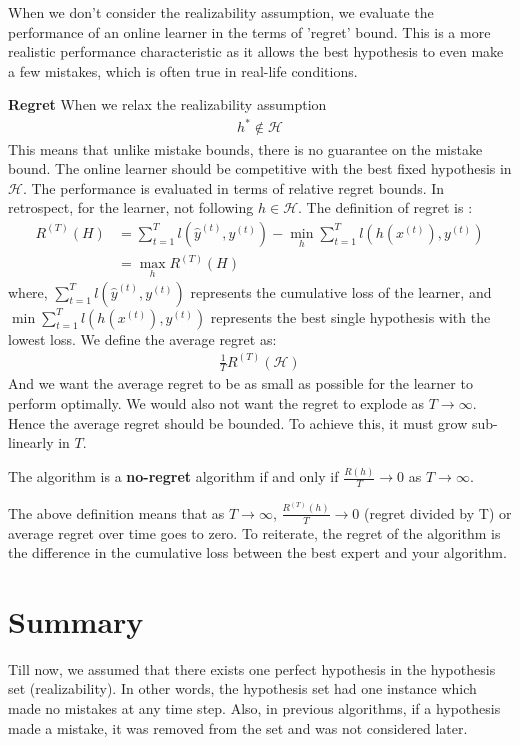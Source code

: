 \documentclass[11pt]{article}
\DeclareMathOperator*{\minimize}{min}
\DeclareMathOperator*{\maximize}{max}
\begin{document}
When we don't consider the realizability assumption, we evaluate the performance of an online learner in the terms of 'regret' bound. This is a more realistic performance characteristic as it allows the best hypothesis to even make a few mistakes, which is often true in real-life conditions.

\normalfont\textbf{Regret} 
When we relax the realizability assumption
\begin{align*}
    h^{*} \notin \mathcal{H}
\end{align*}
This means that unlike mistake bounds, there is no guarantee on the mistake bound. The online learner should be competitive with the best fixed hypothesis in $\mathcal{H}$. The performance is evaluated in terms of relative regret bounds. In retrospect, for the learner, not following $ h \in \mathcal{H}$. The definition of regret is : 
\begin{align}
    R^{(T)}(H)&=\sum_{t=1}^{T} l(\hat{y}^{(t)}, y^{(t)}) - \minimize_{h}  \sum_{t=1}^{T} l(h(x^{(t)}), y^{(t)})\label{def:regret}
    \\
    &= \maximize_{h} R^{(T)}(H)
\end{align} 
\normalfont
where, $\sum_{t=1}^{T} l(\hat{y}^{(t)}, y^{(t)})$ represents the cumulative loss of the learner, and $\minimize\sum_{t=1}^{T} l(h(x^{(t)}), y^{(t)})$ represents the best single hypothesis with the lowest loss. We define the average regret as:
\begin{align}
    \frac{1}{T}R^{(T)}(\mathcal{H})
\end{align}
And we want the average regret to be as small as possible for the learner to perform optimally. We would also not want the regret to explode as $T \rightarrow \infty$. Hence the average regret should be bounded. To achieve this, it must grow sub-linearly in $T$.


The algorithm is a \textbf{no-regret} algorithm if and only if $\frac{R(h)}{T}\rightarrow0$ as $T\rightarrow\infty$.

\normalfont
The above definition means that as $T\rightarrow\infty$, $\frac{R^{(T)}(h)}{T}\rightarrow0$ (regret divided by T) or average regret over time goes to zero. 
To reiterate, the regret of the algorithm is the difference in the cumulative loss between the best expert and your algorithm.

\section{Summary}
\normalfont
Till now, we assumed that there exists one perfect hypothesis in the hypothesis set (realizability). In other words, the hypothesis set had one instance which made no mistakes at any time step. Also, in previous algorithms, if a hypothesis made a mistake, it was removed from the set and was not considered later.
\end{document}
